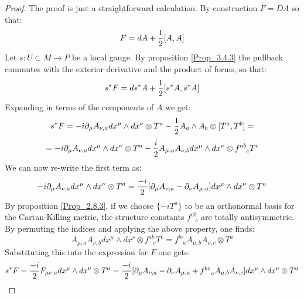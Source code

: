 \documentclass[12pt,a4paper]{report}
\theoremstyle{definition}
\theoremstyle{Theorem}
\theoremstyle{definition}
\theoremstyle{definition}
\begin{document}
	\begin{proof}
		The proof is just a straightforward calculation. By construction $F=DA$ so that:
		$$F=dA+{1\over 2}[A,A]$$
		Let $s:U\subset M\rightarrow P$ be a local gauge. By proposition \ref{Prop_3.4.3} the pullback commutes with the exterior derivative and the product of forms, so that:
		$$s^*F=ds^*A+{1\over 2}[s^*A,s^*A]$$
		Expanding in terms of the components of $A$ we get:
		$$s^*F=-i\partial_\mu A_{\nu,a}dx^\mu\wedge dx^\nu\otimes T^a-{1\over 2}A_a\wedge A_b\otimes [T^a,T^b]=$$
		$$=-i\partial_\mu A_{\nu,a}dx^\mu\wedge dx^\nu\otimes T^a-{i\over 2}A_{\mu,a}A_{\nu,b}dx^\mu\wedge dx^\nu \otimes f^{ab}_{\hspace{9pt}c}T^c$$
		We can now re-write the first term as:
		$$-i\partial_\mu A_{\nu,a}dx^\mu\wedge dx^\nu\otimes T^a={-i\over 2}[\partial_\mu A_{\nu,a}-\partial_\nu A_{\mu,a}]dx^\mu\wedge dx^\nu\otimes T^a$$
		By proposition \ref{Prop_2.8.3}, if we choose $\{-iT^a\}$ to be an orthonormal basis for the Cartan-Killing metric, the structure constants $f^{ab}_{\hspace{9pt}c}$ are totally antisymmetric. By permuting the indices and applying the above property, one finds:
		$$A_{\mu,a}A_{\nu,b}dx^\mu\wedge dx^\nu \otimes f^{ab}_{\hspace{9pt}c}T^c=f^{bc}_{\hspace{9pt}a}A_{\mu,b}A_{\nu,c}\otimes T^a$$
		Substituting this into the expression for $F$ one gets:
		$$s^*F={-i\over 2}F_{\mu\nu,a}dx^\mu\wedge dx^\nu\otimes T^a={-i\over 2}[\partial_{\mu}A_{\nu,a}-\partial_{\nu}A_{\mu,a}+f^{bc}_{\hspace{9pt}a}A_{\mu,b}A_{\nu,c}]dx^\mu\wedge dx^\nu \otimes T^a$$
	\end{proof}
\end{document}
